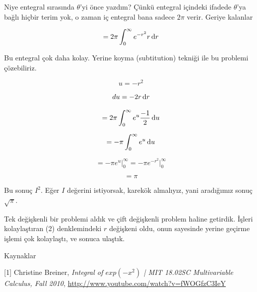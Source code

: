 \documentclass[12pt,fleqn]{article}\usepackage{../../common}
\begin{document}
Niye entegral sırasında $\theta$'yi önce yazdım? Çünkü entegral içindeki
ifadede $\theta$'ya bağlı hiçbir terim yok, o zaman iç entegral bana sadece
$2\pi$ verir. Geriye kalanlar

$$=  2\pi \int_{0}^{\infty} e^{-r^2} r \,\mathrm{d} r $$

Bu entegral çok daha kolay. Yerine koyma (subtitution) tekniği ile bu
problemi çözebiliriz. 

$$ u = -r^2 $$

$$ du =  -2r \,\mathrm{d} r$$

$$=  2\pi \int_{0}^{\infty} e^u \frac{-1}{2} \,\mathrm{d} u $$

$$=  -\pi \int_{0}^{\infty} e^u \,\mathrm{d} u $$

$$=  -\pi  e^u  \bigg|_{0}^{\infty} = -\pi  e^{-r^2}  \bigg|_{0}^{\infty} $$

$$ = \pi $$

Bu sonuç $I^2$. Eğer $I$ değerini istiyorsak, karekök almalıyız, yani
aradığımız sonuç $\sqrt{\pi}$. 

Tek değişkenli bir problemi aldık ve çift değişkenli problem haline
getirdik. İşleri kolaylaştıran (2) denklemindeki $r$ değişkeni oldu, onun
sayesinde yerine geçirme işlemi çok kolaylaştı, ve sonuca ulaştık. 

Kaynaklar

[1] Christine Breiner, {\em Integral of $exp(-x^2)$ | MIT 18.02SC Multivariable
  Calculus, Fall 2010}, \url{http://www.youtube.com/watch?v=fWOGfzC3IeY}
\end{document}
